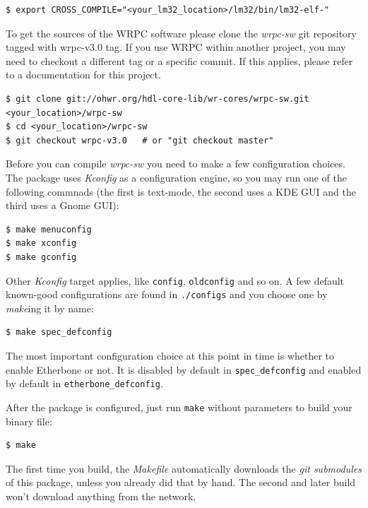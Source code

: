 \documentclass[a4paper, 12pt]{article}
\newcommand{\code}[1]{\texttt{#1}}
\newcommand{\codeHook}[1]{\mbox{\ttfamily\MakeTextUppercase{#1}}}
\begin{document}
\begin{lstlisting}
$ export CROSS_COMPILE="<your_lm32_location>/lm32/bin/lm32-elf-"
\end{lstlisting}

To get the sources of the \codeHook{wrpc} software please clone the \textit{wrpc-sw} git
repository tagged with wrpc-v3.0 tag. If you use \codeHook{wrpc} within another
project, you may need to checkout a different tag or a specific commit. If this
applies, please refer to a documentation for this project.

\begin{lstlisting}
$ git clone git://ohwr.org/hdl-core-lib/wr-cores/wrpc-sw.git <your_location>/wrpc-sw
$ cd <your_location>/wrpc-sw
$ git checkout wrpc-v3.0   # or "git checkout master"
\end{lstlisting}

Before you can compile \textit{wrpc-sw} you need to make a few configuration choices.
The package uses \textit{Kconfig} as a configuration engine, so you may run one of the
following commnads (the first is text-mode, the second uses a KDE GUI
and the third uses a Gnome GUI):

\begin{lstlisting}
$ make menuconfig
$ make xconfig
$ make gconfig
\end{lstlisting}

Other \textit{Kconfig} target applies, like \code{config}, \code{oldconfig}
and so on.  A few default known-good configurations are found in
\texttt{./configs} and you choose one by \textit{make}ing it by name:

\begin{lstlisting}
$ make spec_defconfig
\end{lstlisting}

The most important configuration choice at this point in time is
whether to enable Etherbone or not. It is disabled by default in
\code{spec\_defconfig} and enabled by default in
\code{etherbone\_defconfig}.

After the package is configured, just run \code{make} without
parameters to build your binary file:

\begin{lstlisting}
$ make
\end{lstlisting}

The first time you build, the \textit{Makefile} automatically downloads
the \textit{git submodules} of this package, unless you already did that
by hand. The second and later build won't download anything
from the network.
\end{document}
